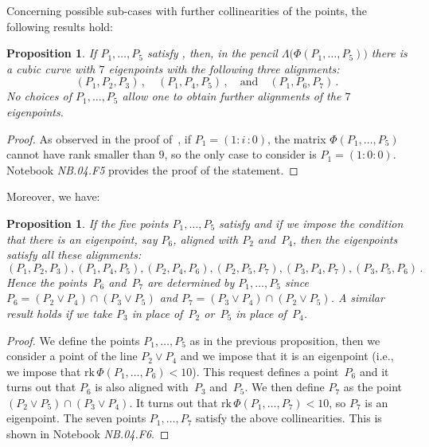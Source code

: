 \documentclass[a4paper, 11pt, reqno]{amsart}
\theoremstyle{plain}
\newtheorem{prop}[lemma]{Proposition}
\theoremstyle{definition}
\newcommand{\nb}[2]{\textsl{{NB}.{#1}.{#2}}}
\newcommand{\iii}{\textit{i}\,}
\newcommand{\rk}{\ensuremath{\mathrm{rk}}}
\begin{document}
Concerning possible sub-cases with further collinearities of the points,
the following results hold:
\begin{prop}
\label{three_d_three_alignments}
If $P_1, \dots, P_5$ satisfy ,
then, in the pencil $\Lambda \bigl( \Phi(P_1, \dotsc, P_5)\bigr)$ there is
a cubic curve with $7$ eigenpoints with the following three alignments:
%
\[
 (P_1, P_2, P_3) \,, \quad (P_1, P_4, P_5) \,, \quad \text{and} \quad (P_1, P_6, P_7) \,.
\]
%
No choices of $P_1, \dots, P_5$ allow one to obtain further alignments of the $7$ eigenpoints.
\end{prop}
%
\begin{proof}
As observed in the proof of~, if $P_1 = (1: \iii: 0)$,
the matrix
$\Phi(P_1, \dots, P_5)$ cannot have rank smaller than $9$, so the only
case to consider is $P_1 = (1: 0: 0)$.
Notebook \nb{04}{F5} provides the proof of the statement.
\end{proof}
%
Moreover, we have:
%
\begin{prop}
\label{prop:d2_6allin}
If the five points $P_1, \dots, P_5$ satisfy 
and if we impose the condition that there is an eigenpoint, say $P_6$, aligned with $P_2$ and~$P_4$, then the eigenpoints satisfy all these
alignments:
%
\[
  (P_1, P_2, P_3), (P_1, P_4, P_5),
  (P_2, P_4, P_6), (P_2, P_5, P_7),
  (P_3, P_4, P_7), (P_3, P_5, P_6) \,.
\]
%
Hence the points~$P_6$ and~$P_7$ are determined by $P_1, \dots, P_5$
since
$P_6 = (P_2 \vee P_4) \cap (P_3 \vee P_5)$
and $P_7 = (P_3 \vee P_4) \cap (P_2 \vee P_5)$.
A similar result holds if we take $P_3$ in place of~$P_2$ or~$P_5$
in place of~$P_4$.
\end{prop}
%
\begin{proof}
We define the points $P_1, \dots, P_5$ as in the previous proposition, then 
we consider a point of the line $P_2 \vee P_4$ and we impose that it is 
an eigenpoint (i.e., we impose that $\rk \, \Phi(P_1, \dotsc, P_6) < 10$).
This request defines a point~$P_6$ and it turns out that $P_6$ is also aligned 
with~$P_3$ and~$P_5$. We then define $P_7$ as the point 
$(P_2 \vee P_5) \cap (P_3 \vee P_4)$. It turns out that 
$\rk \, \Phi(P_1, \dots, P_7) < 10$, so $P_7$ is an eigenpoint. The seven 
points $P_1, \dotsc, P_7$ satisfy the above collinearities.
This is shown in Notebook \nb{04}{F6}.
\end{proof}
\end{document}
